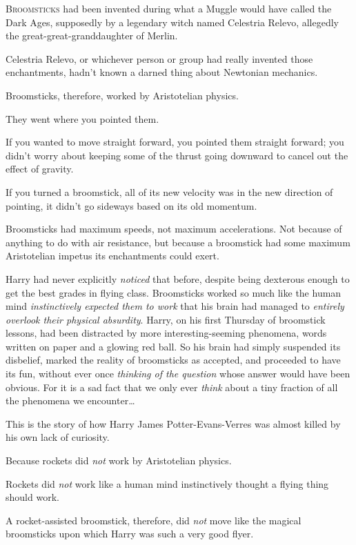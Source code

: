 
\lettrine{B}{roomsticks} had been invented during what a Muggle would have called the Dark Ages, supposedly by a legendary witch named Celestria Relevo, allegedly the great-great-granddaughter of Merlin.

Celestria Relevo, or whichever person or group had really invented those enchantments, hadn't known a darned thing about Newtonian mechanics.

Broomsticks, therefore, worked by Aristotelian physics.

They went where you pointed them.

If you wanted to move straight forward, you pointed them straight forward; you didn't worry about keeping some of the thrust going downward to cancel out the effect of gravity.

If you turned a broomstick, all of its new velocity was in the new direction of pointing, it didn't go sideways based on its old momentum.

Broomsticks had maximum speeds, not maximum accelerations. Not because of anything to do with air resistance, but because a broomstick had some maximum Aristotelian impetus its enchantments could exert.

Harry had never explicitly \emph{noticed} that before, despite being dexterous enough to get the best grades in flying class. Broomsticks worked so much like the human mind \emph{instinctively expected them to work} that his brain had managed to \emph{entirely overlook their physical absurdity}. Harry, on his first Thursday of broomstick lessons, had been distracted by more interesting-seeming phenomena, words written on paper and a glowing red ball. So his brain had simply suspended its disbelief, marked the reality of broomsticks as accepted, and proceeded to have its fun, without ever once \emph{thinking of the question} whose answer would have been obvious. For it is a sad fact that we only ever \emph{think} about a tiny fraction of all the phenomena we encounter{\ldots}

This is the story of how Harry James Potter-Evans-Verres was almost killed by his own lack of curiosity.

Because rockets did \emph{not} work by Aristotelian physics.

Rockets did \emph{not} work like a human mind instinctively thought a flying thing should work.

A rocket-assisted broomstick, therefore, did \emph{not} move like the magical broomsticks upon which Harry was such a very good flyer.

